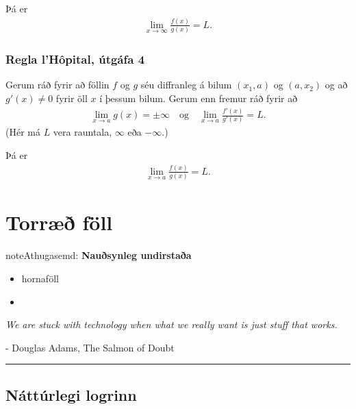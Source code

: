 \documentclass[b5paper,11pt,icelandic]{sphinxmanual}
\begin{document}
Þá er
\begin{equation*}
\begin{split}\lim_{x\rightarrow \infty}\frac{f(x)}{g(x)}=L.\end{split}
\end{equation*}

\subsection{Regla l’Hôpital, útgáfa 4}
\label{kafli03:regla-lhopital-utgafa-4}
Gerum ráð fyrir að föllin \(f\) og \(g\) séu diffranleg á bilum
\((x_1, a)\) og \((a, x_2)\) og að \(g'(x)\neq 0\) fyrir öll
\(x\) í þessum bilum. Gerum enn fremur ráð fyrir að
\begin{equation*}
\begin{split}\lim_{x\rightarrow a}g(x)=\pm\infty
\quad\mbox{og}\quad \lim_{x\rightarrow a}\frac{f'(x)}{g'(x)}=L.\end{split}
\end{equation*}
(Hér má \(L\) vera rauntala, \(\infty\) eða \(-\infty\).)

Þá er
\begin{equation*}
\begin{split}\lim_{x\rightarrow a}\frac{f(x)}{g(x)}=L.\end{split}
\end{equation*}

\chapter{Torræð föll}
\label{kafli04:torrae-foll}\label{kafli04::doc}
\begin{notice}{note}{Athugasemd:}
\textbf{Nauðsynleg undirstaða}
\begin{itemize}
\item {} 
hornaföll

\item {} 
{\hyperref[kafli01:andhverfa]{}}

\end{itemize}
\end{notice}

\emph{We are stuck with technology when what we really want is just stuff that works.}

- Douglas Adams, The Salmon of Doubt


\bigskip\hrule{}\bigskip



\section{Náttúrlegi logrinn}
\label{kafli04:natturlegi-logrinn}
\end{document}

